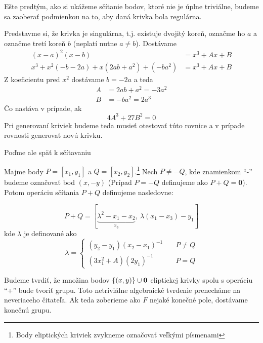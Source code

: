 Ešte predtým, ako si ukážeme sčítanie bodov, ktoré nie je úplne
triviálne, budeme sa zaoberať podmienkou na to, aby daná krivka bola
regulárna.

Predstavme si, že krivka je singulárna, t.j. existuje dvojitý koreň,
označme ho $a$ a označme tretí koreň $b$ (neplatí nutne $a\ne b$).
Dostávame
\begin{align*}
    (x-a)^2 (x-b) &= x^3 + Ax + B \\
    x^3 + x^2 (-b -2a) + x (2ab + a^2) + (-b a^2) &= x^3 + Ax + B
\end{align*}
Z koeficientu pred $x^2$ dostávame $b=-2a$ a teda
\begin{align*}
    A &= 2ab + a^2 = -3 a^2 \\
    B &= -b a^2 = 2 a^3
\end{align*}
Čo nastáva v prípade, ak
\begin{equation*}
    4 A^3 + 27 B^2 = 0
\end{equation*}
Pri generovaní kriviek budeme teda musieť otestovať túto rovnice a v
prípade rovnosti generovať novú krivku.

Poďme ale späť k sčítavaniu
\begin{definicia}
    Majme body $P=[x_1,y_1]$ a $Q=[x_2,y_2]$.\footnote{Body
        eliptických kriviek zvykneme označovať veľkými písmenami}
    Nech $P \ne -Q$, kde znamienkom ``-'' budeme označovať
    bod $(x,-y)$ (Prípad $P = -Q$ definujeme ako $P+Q=\mathbf{0}$).
    Potom operáciu sčítania $P+Q$ definujeme nasledovne:

    \begin{equation*}
        P+Q = [ \underbrace{\lambda^2 - x_1 - x_2}_{x_3}, \ 
            \lambda (x_1 - x_3) - y_1]
    \end{equation*}
    kde $\lambda$ je definované ako
    \begin{equation*}
        \lambda =
            \begin{cases}
                (y_2 -y_1)(x_2 - x_1)^{-1} \quad & P \ne Q \\
                (3 x_1^2 + A)(2 y_1)^{-1} \quad & P = Q
            \end{cases}
    \end{equation*}
\end{definicia}

Budeme tvrdiť, že množina bodov $\{(x,y)\} \cup \mathbf{0}$
eliptickej krivky spolu s operáciu ``+'' bude tvoriť grupu. Toto
netriviálne algebraické tvrdenie prenecháme na neveriaceho
čitateľa. Ak teda zoberieme ako $F$ nejaké konečné
pole, dostávame konečnú grupu.

